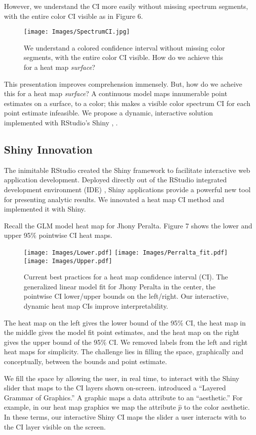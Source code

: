 However, we understand the CI more easily without missing spectrum segments, with the entire color CI visible as in Figure 6.
  \begin{figure}[H]
  \centering
	\texttt{[image: Images/SpectrumCI.jpg]}
	\caption{We understand a colored confidence interval without missing color segments, with the entire color CI visible. How do we achieve this for a heat map {\it surface}?}
	\end{figure}
This presentation improves comprehension immensely. But, how do we acheive this for a heat map {\it surface}? A continuous model maps innumerable point estimates on a surface, to a color; this makes a visible color spectrum CI for each point estimate infeasible. We propose a dynamic, interactive solution implemented with RStudio's Shiny \citep{Shiny}, \citep{RStudio}.

\subsection{Shiny Innovation}
The inimitable RStudio created the Shiny framework to facilitate interactive web application development. Deployed directly out of the RStudio integrated development environment (IDE) \citep{IDE}, Shiny applications provide a powerful new tool for presenting analytic results. We innovated a heat map CI method and implemented it with Shiny.

Recall the GLM model heat map for Jhony Peralta. Figure 7 shows the lower and upper 95\% pointwise CI heat maps.

  \begin{figure}[H]
	\centering
	\texttt{[image: Images/Lower.pdf]}
	\texttt{[image: Images/Perralta\_fit.pdf]}
	\texttt{[image: Images/Upper.pdf]}
	\caption{Current best practices for a heat map confidence interval (CI). The generalized linear model fit for Jhony Peralta in the center, the pointwise CI lower/upper bounds on the left/right. Our interactive, dynamic heat map CIs improve interpretability.}
	\end{figure}
The heat map on the left gives the lower bound of the 95\% CI, the heat map in the middle gives the model fit point estimates, and the heat map on the right gives the upper bound of the 95\% CI. We removed labels from the left and right heat maps for simplicity. The challenge lies in filling the space, graphically and conceptually, between the bounds and point estimate. 

We fill the space by allowing the user, in real time, to interact with the Shiny slider that maps to the CI layers shown on-screen. \cite{Wickham2010} introduced a ``Layered Grammar of Graphics.'' A graphic maps a data attribute to an ``aesthetic.'' For example, in our heat map graphics we map the attribute $\hat{p}$ to the color aesthetic. In these terms, our interactive Shiny CI maps the slider a user interacts with to the CI layer visible on the screen. 

